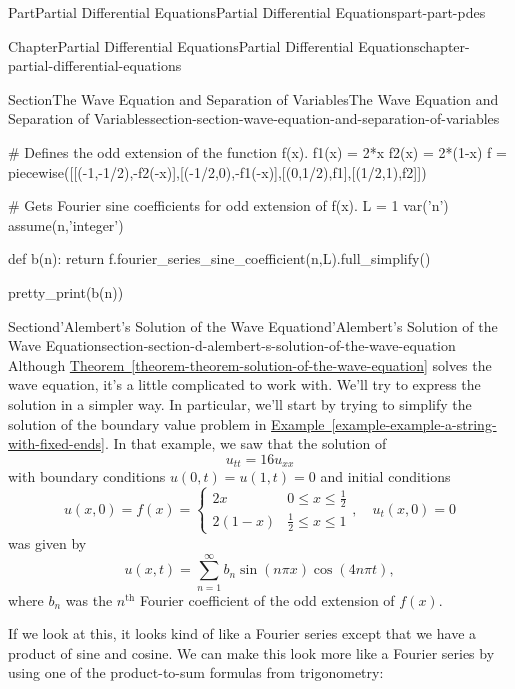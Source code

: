 \documentclass[twoside,10pt,]{book}
\newcommand{\xreffont}{\relax}
\numberwithin{equation}{part}
\renewcommand{\th}{\text{th}}
\newcommand{\amp}{&}
\begin{document}
\begin{partptx}{Part}{Partial Differential Equations}{}{Partial Differential Equations}{}{}{part-part-pdes}
\begin{chapterptx}{Chapter}{Partial Differential Equations}{}{Partial Differential Equations}{}{}{chapter-partial-differential-equations}
\begin{sectionptx}{Section}{The Wave Equation and Separation of Variables}{}{The Wave Equation and Separation of Variables}{}{}{section-section-wave-equation-and-separation-of-variables}
\begin{sageinput}
# Defines the odd extension of the function f(x).
f1(x) = 2*x
f2(x) = 2*(1-x)
f = piecewise([[(-1,-1/2),-f2(-x)],[(-1/2,0),-f1(-x)],[(0,1/2),f1],[(1/2,1),f2]])

# Gets Fourier sine coefficients for odd extension of f(x).
L = 1
var('n')
assume(n,'integer')

def b(n):
  return f.fourier_series_sine_coefficient(n,L).full_simplify()

pretty_print(b(n))
\end{sageinput}
\end{sectionptx}
%
%
\typeout{************************************************}
\typeout{************************************************}
%
\begin{sectionptx}{Section}{d'Alembert's Solution of the Wave Equation}{}{d'Alembert's Solution of the Wave Equation}{}{}{section-section-d-alembert-s-solution-of-the-wave-equation}
Although \hyperref[theorem-theorem-solution-of-the-wave-equation]{Theorem~{\xreffont\ref{theorem-theorem-solution-of-the-wave-equation}}} solves the wave equation, it's a little complicated to work with. We'll try to express the solution in a simpler way. In particular, we'll start by trying to simplify the solution of the boundary value problem in \hyperref[example-example-a-string-with-fixed-ends]{Example~{\xreffont\ref{example-example-a-string-with-fixed-ends}}}. In that example, we saw that the solution of%
\begin{equation*}
u_{tt} = 16u_{xx}
\end{equation*}
with boundary conditions \(u(0,t) = u(1,t) = 0\) and initial conditions%
\begin{equation*}
u(x,0) = f(x) = \begin{cases} 2x \amp 0\leq x\leq \frac{1}{2} \\ 2(1-x) \amp \frac{1}{2}\leq x\leq 1 \end{cases},\quad u_{t}(x,0) = 0
\end{equation*}
was given by%
\begin{equation*}
u(x,t) = \sum_{n=1}^{\infty}b_{n}\sin(n\pi x)\cos(4n\pi t),
\end{equation*}
where \(b_{n}\) was the \(n^{\th}\) Fourier coefficient of the odd extension of \(f(x)\).%
\par
If we look at this, it looks kind of like a Fourier series except that we have a product of sine and cosine. We can make this look more like a Fourier series by using one of the product-to-sum formulas from trigonometry:%

\end{sectionptx}
\end{chapterptx}
\end{partptx}
\end{document}
